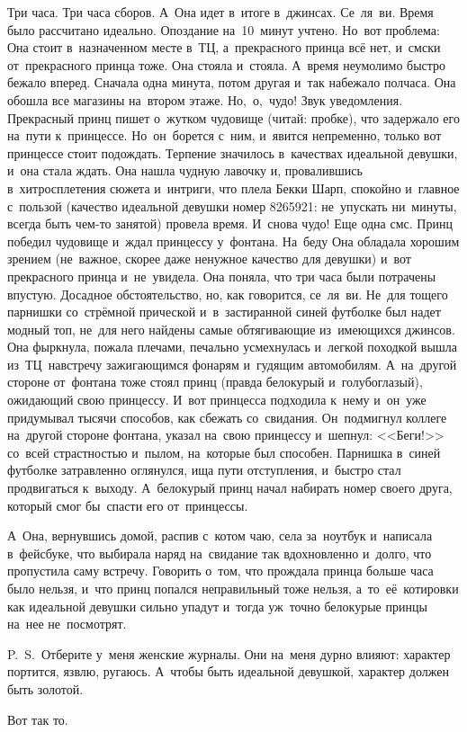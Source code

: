 Три часа.
Три часа сборов.
А~Она идет в~итоге в~джинсах.
Се~ля~ви.
Время было рассчитано идеально.
Опоздание на~10~минут учтено.
Но~вот проблема: Она стоит в~назначенном месте в~ТЦ, а~прекрасного принца всё нет, и~смски от~прекрасного принца тоже.
Она стояла и~стояла.
А~время неумолимо быстро бежало вперед.
Сначала одна минута, потом другая и~так набежало полчаса.
Она обошла все магазины на~втором этаже.
Но,~о,~чудо! Звук уведомления.
Прекрасный принц пишет о~жутком чудовище (читай: пробке), что задержало его на~пути к~принцессе.
Но~он~борется с~ним, и~явится непременно, только вот принцессе стоит подождать.
Терпение значилось в~качествах идеальной девушки, и~она стала ждать.
Она нашла чудную лавочку и, провалившись в~хитросплетения сюжета и~интриги, что плела Бекки Шарп, спокойно и~главное с~пользой (качество идеальной девушки номер 8265921: не~упускать ни~минуты, всегда быть чем-то занятой) провела время.
И~снова чудо! Еще одна смс.
Принц победил чудовище и~ждал принцессу у~фонтана.
На~беду Она обладала хорошим зрением (не~важное, скорее даже ненужное качество для девушки) и~вот прекрасного принца и~не~увидела.
Она поняла, что три часа были потрачены впустую.
Досадное обстоятельство, но, как говорится, се~ля~ви.
Не~для тощего парнишки со~стрёмной прической и~в~застиранной синей футболке был надет модный топ, не~для него найдены самые обтягивающие из~имеющихся джинсов.
Она фыркнула, пожала плечами, печально усмехнулась и~легкой походкой вышла из~ТЦ~навстречу зажигающимся фонарям и~гудящим автомобилям.
А~на~другой стороне от~фонтана тоже стоял принц (правда белокурый и~голубоглазый), ожидающий свою принцессу.
И~вот принцесса подходила к~нему и~он~уже придумывал тысячи способов, как сбежать со~свидания.
Он~подмигнул коллеге на~другой стороне фонтана, указал на~свою принцессу и~шепнул: <<Беги!>> со~всей страстностью и~пылом, на~которые был способен.
Парнишка в~синей футболке затравленно оглянулся, ища пути отступления, и~быстро стал продвигаться к~выходу.
А~белокурый принц начал набирать номер своего друга, который смог бы~спасти его от~принцессы.

А~Она, вернувшись домой, распив с~котом чаю, села за~ноутбук и~написала в~фейсбуке, что выбирала наряд на~свидание так вдохновленно и~долго, что пропустила саму встречу.
Говорить о~том, что прождала принца больше часа было нельзя, и~что принц попался неправильный тоже нельзя, а~то~её~котировки как идеальной девушки сильно упадут и~тогда уж~точно белокурые принцы на~нее не~посмотрят.
 
\vspace{10mm}

P.~S.~Отберите у~меня женские журналы.
Они на~меня дурно влияют: характер портится, язвлю, ругаюсь.
А~чтобы быть идеальной девушкой, характер должен быть золотой.

Вот так то.


